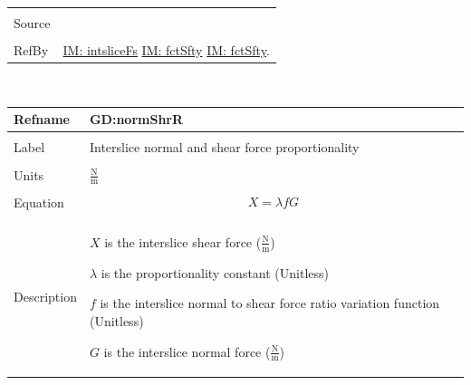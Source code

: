 \documentclass[12pt]{article}
\begin{document}
\begin{minipage}{\textwidth}
\begin{tabular}{p{} p{}}
                                                 \\ \midrule \\
                                                 Source & \cite{chen2005}
                                                          \\ \midrule \\
                                                          RefBy & \hyperref[IM:intsliceFs]{IM: intsliceFs} \hyperref[IM:fctSfty]{IM: fctSfty} \hyperref[IM:fctSfty]{IM: fctSfty}.
\\ \bottomrule \end{tabular}
\end{minipage}
\par~

\noindent \begin{minipage}{\textwidth}
\begin{tabular}{p{} p{}}
\toprule \textbf{Refname} & \textbf{GD:normShrR}
\label{GD:normShrR}
\\ \midrule \\
Label & Interslice normal and shear force proportionality
        \\ \midrule \\
        Units & $\frac{\text{N}}{\text{m}}$
                \\ \midrule \\
                Equation & \begin{displaymath}
                           X=λ f G
                           \end{displaymath}
                           \\ \midrule \\
                           Description & \begin{symbDescription}
                                         \item{$X$ is the interslice shear force ($\frac{\text{N}}{\text{m}}$)}
                                         \item{$λ$ is the proportionality constant (Unitless)}
                                         \item{$f$ is the interslice normal to shear force ratio variation function (Unitless)}
                                         \item{$G$ is the interslice normal force ($\frac{\text{N}}{\text{m}}$)}
                                         \end{symbDescription}

\end{tabular}
\end{minipage}
\end{document}
